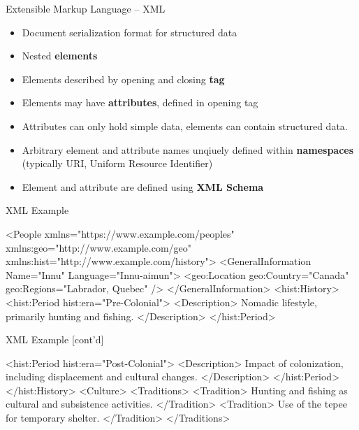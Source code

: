\documentclass[ignorenonframetext,xcolor=x11names]{beamer}
\begin{document}
\begin{frame}{Extensible Markup Language -- XML}
\begin{itemize}
   \item Document serialization format for structured data
   \item Nested \textbf{elements}
   \item Elements described by opening and closing \textbf{tag}
   \item Elements may have \textbf{attributes}, defined in opening tag
   \item Attributes can only hold simple data, elements can contain structured data.
   \item Arbitrary element and attribute names unqiuely defined within \textbf{namespaces} (typically URI, Uniform Resource Identifier)
   \item Element and attribute are defined using \textbf{XML Schema}
\end{itemize}
\end{frame}

\begin{frame}[fragile]{XML Example}
\begin{xmlcode}
<People
      xmlns="https://www.example.com/peoples"
      xmlns:geo="http://www.example.com/geo" 
      xmlns:hist="http://www.example.com/history">
    <GeneralInformation 
            Name="Innu" Language="Innu-aimun">
        <geo:Location geo:Country="Canada" 
                  geo:Regions="Labrador, Quebec" />
    </GeneralInformation>
    <hist:History>
        <hist:Period hist:era="Pre-Colonial">
            <Description>
                Nomadic lifestyle, primarily 
                hunting and fishing.
            </Description>
        </hist:Period>
\end{xmlcode}
\end{frame}

\begin{frame}[fragile]{XML Example \small [cont'd]}
\begin{xmlcode}
        <hist:Period hist:era="Post-Colonial">
            <Description>
                Impact of colonization, 
                including displacement and 
                cultural changes.
            </Description>
        </hist:Period>
    </hist:History>
    <Culture>
        <Traditions>
            <Tradition>
                Hunting and fishing as cultural 
                and subsistence activities.
            </Tradition>
            <Tradition>
                Use of the tepee for temporary 
                shelter.
            </Tradition>
        </Traditions>
\end{xmlcode}
\end{frame}
\end{document}
